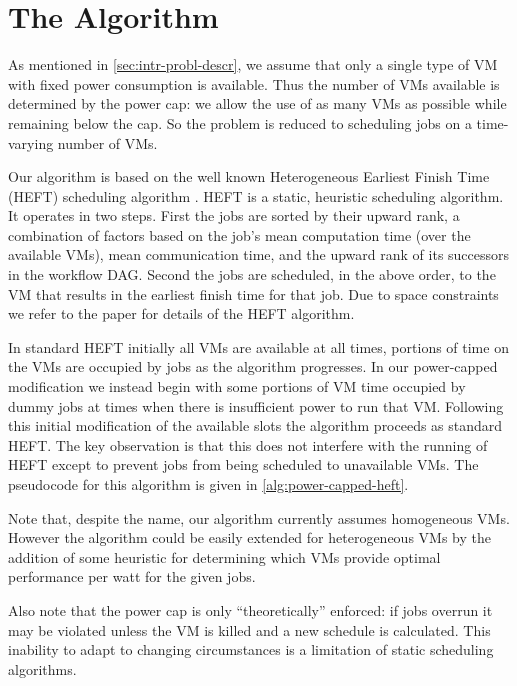 \documentclass[10pt, conference, compsocconf]{IEEEtran} %
\begin{document}
\section{The Algorithm}

As mentioned in \cref{sec:intr-probl-descr}, we assume that only a single type of VM with fixed power consumption is available.
Thus the number of VMs available is determined by the power cap: we allow the use of as many VMs as possible while remaining below the cap.
So the problem is reduced to scheduling jobs on a time-varying number of VMs.

Our algorithm is based on the well known Heterogeneous Earliest Finish Time (HEFT) scheduling algorithm \cite{Topcuoglu2002heft}.
HEFT is a static, heuristic scheduling algorithm.
It operates in two steps.
First the jobs are sorted by their upward rank, a combination of factors based on the job's mean computation time (over the available VMs), mean communication time, and the upward rank of its successors in the workflow DAG.
Second the jobs are scheduled, in the above order, to the VM that results in the earliest finish time for that job.
Due to space constraints we refer to the paper \cite{Topcuoglu2002heft} for details of the HEFT algorithm.

In standard HEFT initially all VMs are available at all times, portions of time on the VMs are occupied by jobs as the algorithm progresses.
In our power-capped modification we instead begin with some portions of VM time occupied by dummy jobs at times when there is insufficient power to run that VM.
Following this initial modification of the available slots the algorithm proceeds as standard HEFT.
The key observation is that this does not interfere with the running of HEFT except to prevent jobs from being scheduled to unavailable VMs.
The pseudocode for this algorithm is given in \cref{alg:power-capped-heft}.

Note that, despite the name, our algorithm currently assumes homogeneous VMs.
However the algorithm could be easily extended for heterogeneous VMs by the addition of some heuristic for determining which VMs provide optimal performance per watt for the given jobs.

Also note that the power cap is only ``theoretically'' enforced: if jobs overrun it may be violated unless the VM is killed and a new schedule is calculated.
This inability to adapt to changing circumstances is a limitation of static scheduling algorithms.
\end{document}
